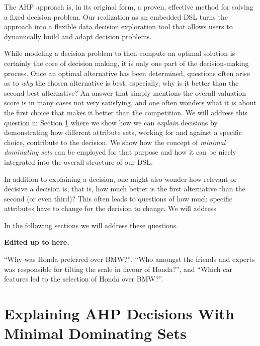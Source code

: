 \documentclass{jfp}
\newcommand{\NOTE}[2][gray]{\smallskip\noindent
  \colorbox{#1!30}{\parbox{.98\linewidth}{{\small\textbf{#2}}}}
}
\newcommand{\prog}[1]{\texttt{#1}}
\begin{document}
%
The AHP approach is, in its original form, a proven, effective method for solving a fixed decision problem. Our realization as an embedded DSL turns the approach into a flexible data decision exploration tool that allows users to dynamically build and adapt decision problems.


While modeling a decision problem to then compute an optimal solution is certainly the core of decision making, it is only one part of the decision-making process. Once an optimal alternative has been determined, questions often arise as to \emph{why} the chosen alternative is best, especially, why is it better than the second-best alternative? 
%
An answer that simply mentions the overall valuation score is in many cases not very satisfying, and one often wonders what it is about the first choice that makes it better than the competition.
%
We will address this question in Section \ref{sec:mds} where we show how we can \emph{explain} decisions by demonstrating how different attribute sets, working for and against a specific choice, contribute to the decision. We show how the concept of \emph{minimal dominating sets} \citep{EKF20padl} can be employed for that purpose and how it can be nicely integrated into the overall structure of our DSL.


In addition to explaining a decision, one might also wonder how relevant or decisive a decision is, that is, how much better is the first alternative than the second (or even third)? This often leads to questions of how much specific attributes have to change for the decision to change. 
%
We will address 

In the following sections we will address these questions.

\NOTE{Edited up to here.}



``Why was Honda preferred over BMW?'', ``Who amongst the friends and experts was responsible for tilting the scale in favour of Honda?'', and ``Which car features led to the selection of Honda over BMW?''. 

 



\section{Explaining AHP Decisions With Minimal Dominating Sets}
\label{sec:mds}
\end{document}
